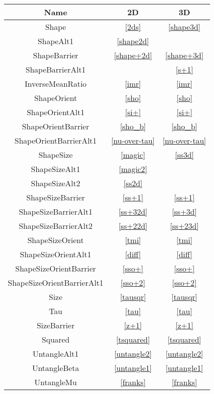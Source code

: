 \documentclass{report}
\begin{document}
\begin{tabular}{|c|c|c|}
\hline
Name & 2D & 3D \\
\hline
Shape & \ref{2ds} & \ref{shape3d} \\
ShapeAlt1 & \ref{shape2d} &  \\
\hline
ShapeBarrier & \ref{shape+2d} & \ref{shape+3d} \\
ShapeBarrierAlt1 &  & \ref{s+1} \\
InverseMeanRatio & \ref{imr} & \ref{imr} \\
\hline
ShapeOrient & \ref{sho} & \ref{sho} \\
ShapeOrientAlt1 & \ref{si+} & \ref{si+} \\
\hline
ShapeOrientBarrier & \ref{sho_b} & \ref{sho_b} \\
ShapeOrientBarrierAlt1 & \ref{nu-over-tau} & \ref{nu-over-tau} \\
\hline
ShapeSize & \ref{magic} & \ref{ss3d} \\
ShapeSizeAlt1 & \ref{magic2} &  \\
ShapeSizeAlt2 & \ref{ss2d} &  \\
\hline
ShapeSizeBarrier & \ref{ss+1} & \ref{ss+1} \\
ShapeSizeBarrierAlt1 & \ref{ss+32d} & \ref{ss+3d} \\
ShapeSizeBarrierAlt2 & \ref{ss+22d} & \ref{ss+23d} \\
\hline
ShapeSizeOrient & \ref{tmi} & \ref{tmi} \\
ShapeSizeOrientAlt1 & \ref{diff} & \ref{diff} \\
\hline
ShapeSizeOrientBarrier & \ref{sso+} & \ref{sso+} \\
ShapeSizeOrientBarrierAlt1 & \ref{sso+2} & \ref{sso+2} \\
\hline
Size & \ref{tausqr} & \ref{tausqr} \\
Tau & \ref{tau} & \ref{tau} \\
\hline
SizeBarrier & \ref{z+1} & \ref{z+1} \\
\hline
Squared & \ref{tsquared} & \ref{tsquared} \\
\hline
UntangleAlt1 & \ref{untangle2} & \ref{untangle2} \\
UntangleBeta & \ref{untangle1} & \ref{untangle1} \\
UntangleMu & \ref{franks} & \ref{franks} \\
\hline
\end{tabular}
\end{document}
